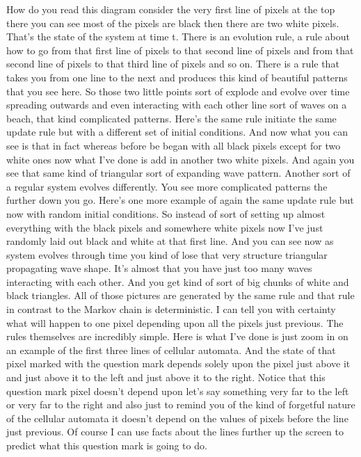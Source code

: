 \documentclass[]{article}
\begin{document}
How do you read this diagram
consider the very first line of pixels
at the top there
you can see most of the pixels are black
then there are two white pixels.
That's the state of the system at time t.
There is an evolution rule,
a rule about how to go
from that first line of pixels
to that second line of pixels
and from that second line of pixels
to that third line of pixels
and so on.
There is a rule
that takes you
from one line
to the next
and produces
this kind of beautiful patterns
that you see here.
So those two little points
sort of explode
and evolve over time spreading outwards
and even interacting with each other
line sort of waves
on a beach,
that kind complicated patterns.
Here's the same rule
initiate the same update rule
but with a different set
of initial conditions.
And now what you can see
is that in fact
whereas before be began
with all black pixels
except for two white ones
now what I've done
is add in another two white pixels.
And again you see that same
kind of triangular
sort of expanding wave pattern.
Another sort of a regular system
evolves differently.
You see more complicated patterns
the further down you go.
Here's one more example
of again the same update rule
but now with random initial conditions.
So instead of sort of setting up
almost everything with the black pixels
and somewhere white pixels
now I've just randomly laid out
black and white at that first line.
And you can see now
as system evolves through time
you kind of lose that very structure
triangular propagating wave shape.
It's almost that you have just
too many waves
interacting with each other.
And you get kind of sort of big chunks
of white and black triangles.
All of those pictures are generated
by the same rule
and that rule
in contrast to the Markov chain
is deterministic.
I can tell you with certainty
what will happen to one pixel
depending upon
all the pixels just previous.
The rules themselves
are incredibly simple.
Here is what I've done is just zoom in
on an example of the first three lines
of cellular automata.
And the state of that pixel marked
with the question mark
depends solely upon
the pixel just above it
and just above it to the left
and just above it to the right.
Notice that this question mark pixel
doesn't depend upon
let's say something very far to the left
or very far to the right
and also
just to remind you
of the kind of forgetful nature
of the cellular automata
it doesn't depend
on the values of pixels
before
the line just previous.
Of course
I can use facts about the lines
further up
the screen
to predict
what this question mark is going to do.
\end{document}
